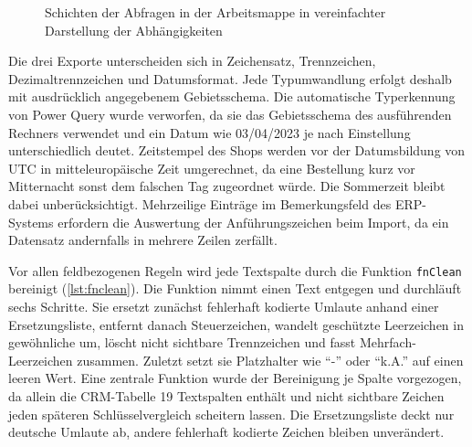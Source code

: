 \documentclass[a4paper,12pt]{article}
\newcommand{\pq}[1]{\texttt{#1}}        %
\begin{document}
\begin{figure}[H]
{}
\caption{Schichten der Abfragen in der Arbeitsmappe in vereinfachter Darstellung der Abhängigkeiten}
\label{fig:abhaengigkeiten}
\end{figure}

Die drei Exporte unterscheiden sich in Zeichensatz, Trennzeichen, Dezimaltrennzeichen und Datumsformat. Jede Typumwandlung erfolgt deshalb mit ausdrücklich angegebenem Gebietsschema. Die automatische Typerkennung von Power Query wurde verworfen, da sie das Gebietsschema des ausführenden Rechners verwendet und ein Datum wie 03/04/2023 je nach Einstellung unterschiedlich deutet. Zeitstempel des Shops werden vor der Datumsbildung von UTC in mitteleuropäische Zeit umgerechnet, da eine Bestellung kurz vor Mitternacht sonst dem falschen Tag zugeordnet würde. Die Sommerzeit bleibt dabei unberücksichtigt. Mehrzeilige Einträge im Bemerkungsfeld des ERP-Systems erfordern die Auswertung der Anführungszeichen beim Import, da ein Datensatz andernfalls in mehrere Zeilen zerfällt.

Vor allen feldbezogenen Regeln wird jede Textspalte durch die Funktion \pq{fnClean} bereinigt (\cref{lst:fnclean}). Die Funktion nimmt einen Text entgegen und durchläuft sechs Schritte. Sie ersetzt zunächst fehlerhaft kodierte Umlaute anhand einer Ersetzungsliste, entfernt danach Steuerzeichen, wandelt geschützte Leerzeichen in gewöhnliche um, löscht nicht sichtbare Trennzeichen und fasst Mehrfach-Leerzeichen zusammen. Zuletzt setzt sie Platzhalter wie \enquote{-} oder \enquote{k.A.} auf einen leeren Wert. Eine zentrale Funktion wurde der Bereinigung je Spalte vorgezogen, da allein die CRM-Tabelle 19 Textspalten enthält und nicht sichtbare Zeichen jeden späteren Schlüsselvergleich scheitern lassen. Die Ersetzungsliste deckt nur deutsche Umlaute ab, andere fehlerhaft kodierte Zeichen bleiben unverändert.
\end{document}
